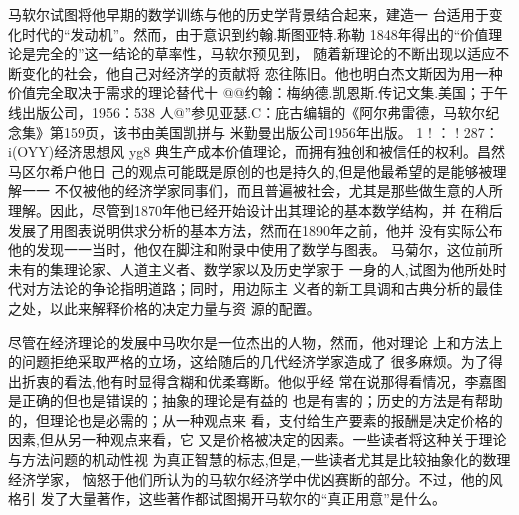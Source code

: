 马软尔试图将他早期的数学训练与他的历史学背景结合起来，建造一
台适用于变化时代的“发动机”。然而，由于意识到约翰.斯图亚特.称勒
1848年得出的“价值理论是完全的”这一结论的草率性，马软尔预见到，
随着新理论的不断出现以适应不断变化的社会，他自己对经济学的贡献将
恋往陈旧。他也明白杰文斯因为用一种价值完全取决于需求的理论替代十
@@约翰：梅纳德.凯恩斯.传记文集.美国；于午线出版公司，1956：538
人@”参见亚瑟.C：庇古编辑的《阿尔弗雷德，马软尔纪念集》第159页，该书由美国凯拼与
米勤曼出版公司1956年出版。
1
!
：
!
287：
i(OYY)经济思想风
yg8
典生产成本价值理论，而拥有独创和被信任的权利。昌然马区尔希户他日
己的观点可能既是原创的也是持久的,但是他最希望的是能够被理解一一
不仅被他的经济学家同事们，而且普遍被社会，尤其是那些做生意的人所
理解。因此，尽管到1870年他已经开始设计出其理论的基本数学结构，并
在稍后发展了用图表说明供求分析的基本方法，然而在1890年之前，他并
没有实际公布他的发现一一当时，他仅在脚注和附录中使用了数学与图表。
马菊尔，这位前所未有的集理论家、人道主义者、数学家以及历史学家于
一身的人,试图为他所处时代对方法论的争论指明道路；同时，用边际主
义者的新工具调和古典分析的最佳之处，以此来解释价格的决定力量与资
源的配置。

尽管在经济理论的发展中马吹尔是一位杰出的人物，然而，他对理论
上和方法上的问题拒绝采取严格的立场，这给随后的几代经济学家造成了
很多麻烦。为了得出折衷的看法,他有时显得含糊和优柔骞断。他似乎经
常在说那得看情况，李嘉图是正确的但也是错误的；抽象的理论是有益的
也是有害的；历史的方法是有帮助的，但理论也是必需的；从一种观点来
看，支付给生产要素的报酬是决定价格的因素,但从另一种观点来看，它
又是价格被决定的因素。一些读者将这种关于理论与方法问题的机动性视
为真正智慧的标志,但是,一些读者尤其是比较抽象化的数理经济学家，
恼怒于他们所认为的马软尔经济学中优凶赛断的部分。不过，他的风格引
发了大量著作，这些著作都试图揭开马软尔的“真正用意”是什么。

